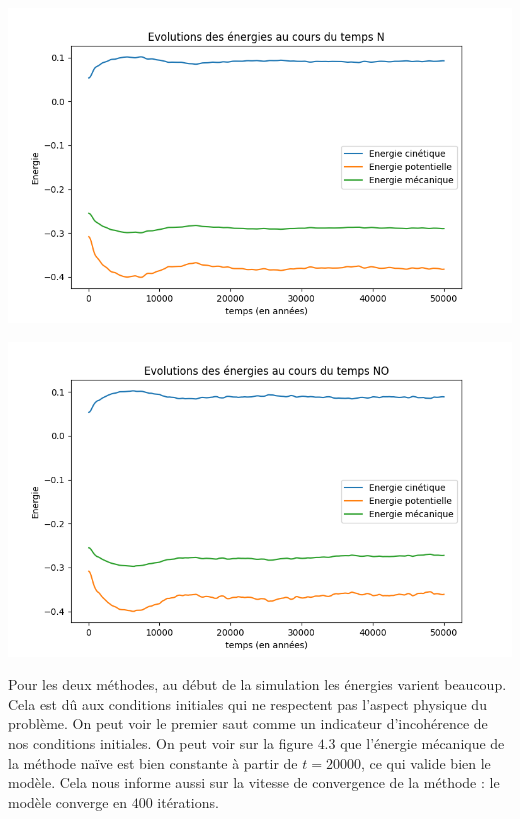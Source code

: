 \begin{center}
\includegraphics[scale=0.6]{resultats/Energy_N.png}
\captionsetup{hypcap=false}
\label{fig4}
\end{center} 

\begin{center}
\includegraphics[scale=0.6]{resultats/Energy_NO.png}
\captionsetup{hypcap=false}
\label{fig5}
\end{center} 


Pour les deux méthodes, au début de la simulation les énergies
varient beaucoup. Cela est dû aux conditions initiales qui ne
respectent pas l'aspect physique du problème. On peut voir le premier saut comme un indicateur d'incohérence de nos conditions initiales.
On peut voir sur la figure $4.3$ que l'énergie mécanique de la
méthode naïve est bien constante à partir de $t=20000$, ce qui
valide bien le modèle. Cela nous informe aussi sur la vitesse de
convergence de la méthode : le modèle converge en $400$ itérations.

